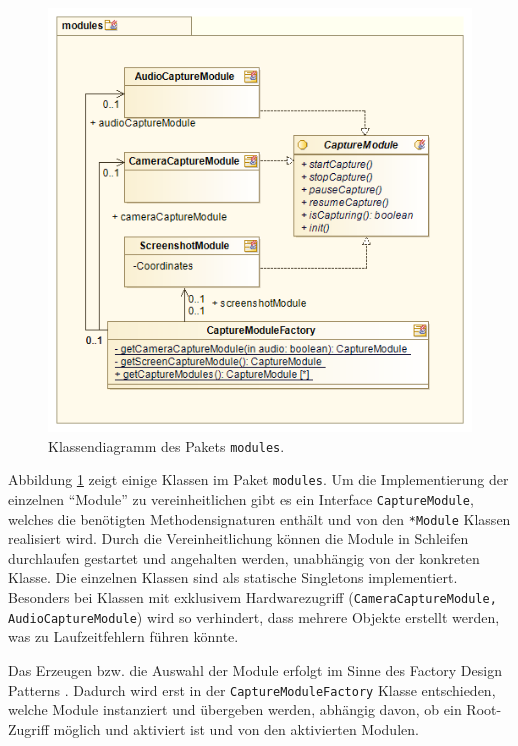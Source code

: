 \begin{figure}
\includegraphics[width=\linewidth]{img/modules_Class_diagram}
\caption{Klassendiagramm des Pakets \mbox{\texttt{modules}}.}
\label{fig:modules_class_diagram}
\end{figure}
Abbildung \ref{fig:modules_class_diagram} zeigt einige Klassen im Paket \texttt{modules}.
Um die Implementierung der einzelnen \enquote{Module} zu vereinheitlichen gibt es ein Interface \texttt{CaptureModule}, welches die benötigten Methodensignaturen enthält und von den \texttt{*Module} Klassen realisiert wird.
Durch die Vereinheitlichung können die Module in Schleifen durchlaufen gestartet und angehalten werden, unabhängig von der konkreten Klasse.
Die einzelnen Klassen sind als statische Singletons \cite[vgl.][21\psq]{designpattern} implementiert.
Besonders bei Klassen mit exklusivem Hardwarezugriff (\texttt{CameraCaptureModule, AudioCaptureModule}) wird so verhindert, dass mehrere Objekte erstellt werden, was zu Laufzeitfehlern führen könnte.

Das Erzeugen bzw. die Auswahl der Module erfolgt im Sinne des Factory Design Patterns \cite[4-6]{designpattern}.
Dadurch wird erst in der \texttt{CaptureModuleFactory} Klasse entschieden, welche Module instanziert und übergeben werden, abhängig davon, ob ein Root-Zugriff möglich und aktiviert ist und von den aktivierten Modulen.

